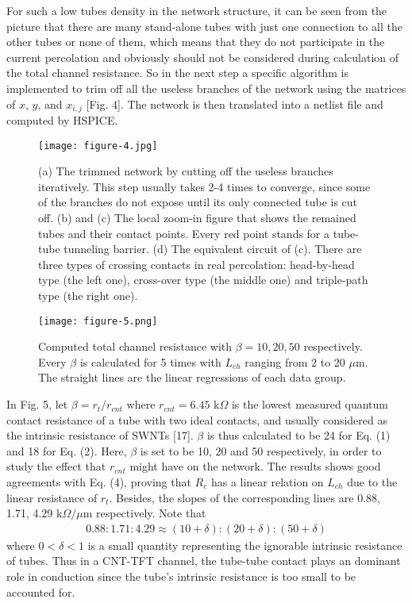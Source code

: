 \documentclass[letterpaper, 10 pt, conference]{ieeeconf}
\begin{document}
For such a low tubes density in the network structure, it can be seen from the picture that there are many stand-alone tubes with just one connection to all the other tubes or none of them, which means that they do not participate in the current percolation and obviously should not be considered during calculation of the total channel resistance. So in the next step a specific algorithm is implemented to trim off all the useless branches of the network using the matrices of $x$, $y$, and $x_{i,j}$ [Fig. 4]. The network is then translated into a netlist file and computed by HSPICE.

\begin{figure}[!h]
  \texttt{[image: figure-4.jpg]}
  \caption{
    (a) The trimmed network by cutting off the useless branches iteratively. This step usually takes 2-4 times to converge, since some of the branches do not expose until its only connected tube is cut off. (b) and (c) The local zoom-in figure that shows the remained tubes and their contact points. Every red point stands for a tube-tube tunneling barrier. (d) The equivalent circuit of (c). There are three types of crossing contacts in real percolation: head-by-head type (the left one), cross-over type (the middle one) and triple-path type (the right one).
  }
\end{figure}

\begin{figure}[!h]
  \texttt{[image: figure-5.png]}
  \caption{
    Computed total channel resistance with $\beta=10,20,50$ respectively. Every $\beta$ is calculated for 5 times with $L_{ch}$ ranging from 2 to 20 $\mu$m. The straight lines are the linear regressions of each data group.
  }
\end{figure}

In Fig. 5, let $\beta=r_t/r_{cnt}$ where $r_{cnt}=6.45$ k$\Omega$ is the lowest measured quantum contact resistance of a tube with two ideal contacts, and usually considered as the intrinsic resistance of SWNTs [17]. $\beta$ is thus calculated to be 24 for Eq. (1) and 18 for Eq. (2). Here, $\beta$ is set to be 10, 20 and 50 respectively, in order to study the effect that $r_{cnt}$ might have on the network. The results shows good agreements with Eq. (4), proving that $R_c$ has a linear relation on $L_{ch}$ due to the linear resistance of $r_t$. Besides, the slopes of the corresponding lines are 0.88, 1.71, 4.29 k$\Omega/\mu$m respectively. Note that
\begin{equation}
  \begin{aligned}
    0.88:1.71:4.29\approx (10+\delta):(20+\delta):(50+\delta)
  \end{aligned}
\end{equation}
where $0<\delta<1$ is a small quantity representing the ignorable intrinsic resistance of tubes. Thus in a CNT-TFT channel, the tube-tube contact plays an dominant role in conduction since the tube's intrinsic resistance is too small to be accounted for.
\end{document}
